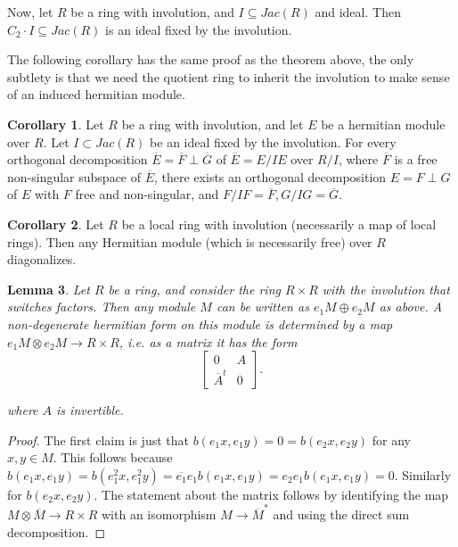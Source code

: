 \documentclass[draftthesis,tocnosub,noragright,centerchapter,10pt]{uiucthesis2009}
\theoremstyle{plain}
\newtheorem{lemma}{Lemma}
\theoremstyle{definition}
\newtheorem{corollary}[lemma]{Corollary}
\begin{document}
Now, let $R$ be a ring with involution, and $I \subseteq Jac(R)$ and
ideal. Then $C_2\cdot I \subseteq Jac(R)$ is an ideal fixed by the
involution. 

The following corollary has the same proof as the theorem above, the
only subtlety is that we need the quotient ring to inherit the
involution to make sense of an induced hermitian module.

\begin{corollary}
Let $R$ be a ring with involution, and let $E$ be a hermitian module over
$R$. Let $I \subset Jac(R)$ be an ideal fixed by the involution. For every orthogonal decomposition $\overline E = \overline F
\perp \overline G$ of $\overline E = E/IE$ over $R/I$, where $\overline
F$ is a free non-singular subspace of $\overline E$, there exists an
orthogonal decomposition $E = F \perp G$ of $E$ with $F$ free and
non-singular, and $F/IF = \overline F, G/IG = \overline G$.
\end{corollary}

\begin{corollary}
Let $R$ be a local ring with involution (necessarily a map of local
rings). Then any Hermitian module (which is necessarily free)
over $R$ diagonalizes. 
\end{corollary}

\begin{lemma} 
Let $R$ be a ring, and consider the ring $R \times R$ with the
involution that switches factors. Then any module $M$ can be
written as $e_1M \oplus e_2M$ as above. A non-degenerate hermitian form on this
module is determined by a map $e_1M \otimes e_2M \rightarrow R \times
R$, i.e. as a matrix it has the form
\[
\begin{bmatrix}
0 & A \\
\overline{A}^t & 0
\end{bmatrix}.
\]

where $A$ is invertible. 
\end{lemma}

\begin{proof}
The first claim is just that $b(e_1x,e_1y) = 0 = b(e_2x,e_2y)$ for any
$x,y \in M$. This follows because $b(e_1x,e_1y) = b(e_1^2x,e_1^2y) =
\overline{e_1}e_1b(e_1x,e_1y) = e_2e_1b(e_1x,e_1y) = 0$. Similarly for
$b(e_2x,e_2y)$. The statement about the matrix follows by identifying
the map $M \otimes \overline M \rightarrow R \times R$ with an isomorphism $M
\rightarrow \overline M^*$ and using the direct sum decomposition. 
\end{proof}
\end{document}
